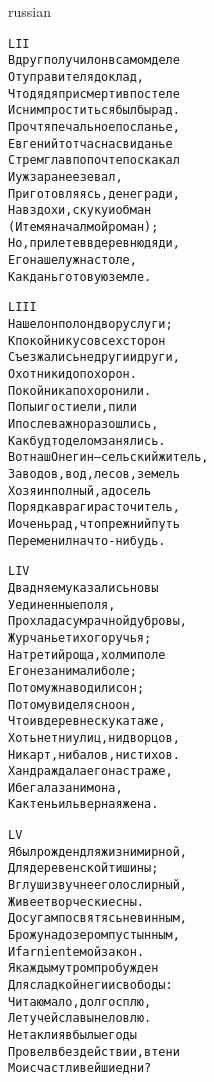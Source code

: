 \documentclass[12pt,twocolumn]{article}
\begin{document}
\begin{center}
\begin{otherlanguage*}{russian}
\begin{minipage}[t]{\dimexpr 0.5\textwidth -\tabcolsep-.5pt}
\begin{alltt}\normalfont\centering
LII
Вдруг получил он в самом деле
От управителя доклад,
Что дядя при смерти в постеле
И с ним проститься был бы рад.
Прочтя печальное посланье,
Евгений тотчас на свиданье
Стремглав по почте поскакал
И уж заранее зевал,
Приготовляясь, денег ради,
На вздохи, скуку и обман
(И тем я начал мой роман);
Но, прилетев в деревню дяди,
Его нашел уж на столе,
Как дань готовую земле.
\end{alltt}
\end{minipage}
\clearpage

\begin{minipage}[t]{\dimexpr 0.5\textwidth -\tabcolsep-.5pt}
\begin{alltt}\normalfont\centering
LIII
Нашел он полон двор услуги;
К покойнику со всех сторон
Съезжались недруги и други,
Охотники до похорон.
Покойника похоронили.
Попы и гости ели, пили
И после важно разошлись,
Как будто делом занялись.
Вот наш Онегин — сельский житель,
Заводов, вод, лесов, земель
Хозяин полный, а досель
Порядка враг и расточитель,
И очень рад, что прежний путь
Переменил на что-нибудь.
\end{alltt}
\end{minipage}

\begin{minipage}[t]{\dimexpr 0.5\textwidth -\tabcolsep-.5pt}
\begin{alltt}\normalfont\centering
LIV
Два дня ему казались новы
Уединенные поля,
Прохлада сумрачной дубровы,
Журчанье тихого ручья;
На третий роща, холм и поле
Его не занимали боле;
Потом уж наводили сон;
Потом увидел ясно он,
Что и в деревне скука та же,
Хоть нет ни улиц, ни дворцов,
Ни карт, ни балов, ни стихов.
Хандра ждала его на страже,
И бегала за ним она,
Как тень иль верная жена.
\end{alltt}
\end{minipage}
\clearpage

\begin{minipage}[t]{\dimexpr 0.5\textwidth -\tabcolsep-.5pt}
\begin{alltt}\normalfont\centering
LV
Я был рожден для жизни мирной,
Для деревенской тишины;
В глуши звучнее голос лирный,
Живее творческие сны.
Досугам посвятясь невинным,
Брожу над озером пустынным,
И far niente мой закон.
Я каждым утром пробужден
Для сладкой неги и свободы:
Читаю мало, долго сплю,
Летучей славы не ловлю.
Не так ли я в былые годы
Провел в бездействии, в тени
Мои счастливейшие дни?
\end{alltt}
\end{minipage}


\end{otherlanguage*}
\end{center}
\end{document}
